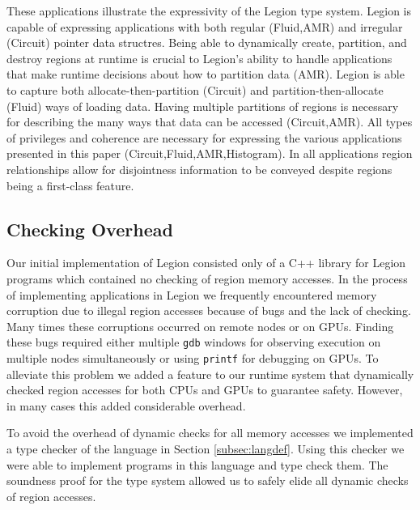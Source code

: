 These applications illustrate the expressivity of the Legion type system.  Legion is capable of 
expressing applications with both regular (Fluid,AMR) and irregular (Circuit) pointer data structres.
Being able to dynamically create, partition, and destroy regions at runtime is crucial to Legion's
ability to handle applications that make runtime decisions about how to partition data (AMR).  Legion
is able to capture both allocate-then-partition (Circuit) and partition-then-allocate (Fluid) ways 
of loading data.  Having multiple partitions of regions is necessary for describing the many ways 
that data can be accessed (Circuit,AMR).  All types of privileges and coherence are necessary for 
expressing the various applications presented in this paper (Circuit,Fluid,AMR,Histogram).  In
all applications region relationships allow for disjointness information to be conveyed despite
regions being a first-class feature.

\subsection{Checking Overhead}
\label{subsec:overhead}
Our initial implementation of Legion consisted only of a C++ library for Legion 
programs\cite{Legion12} which contained no checking of region memory accesses.  In the process
of implementing applications in Legion we frequently encountered memory corruption due to
illegal region accesses because of bugs and the lack of checking.  Many times these corruptions 
occurred on remote nodes or on GPUs.  Finding these bugs required either multiple {\tt gdb} windows
for observing execution on multiple nodes simultaneously or using {\tt printf} for debugging on
GPUs.  To alleviate this problem we added a feature to our runtime system that dynamically checked region 
accesses for both CPUs and GPUs to guarantee safety.  However, in many cases this 
added considerable overhead.  

To avoid the overhead of dynamic checks for all memory accesses we implemented a type checker of the
language in Section \ref{subsec:langdef}.  Using this checker we were able to implement programs
in this language and type check them.  The soundness proof for the type system allowed us to safely
elide all dynamic checks of region accesses.  


